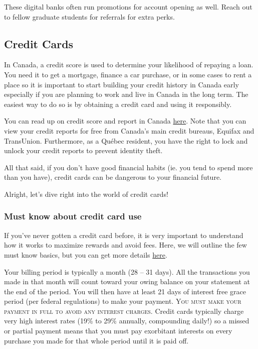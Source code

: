 \begin{plaincorollary}
    These digital banks often run promotions for account opening as well. Reach out to fellow graduate students for referrals for extra perks.
\end{plaincorollary}


\subsection{Credit Cards} 
In Canada, a credit score is used to determine your likelihood of repaying a loan. You need it to get a mortgage, finance a car purchase, or in some cases to rent a place so it is important to start building your credit history in Canada early especially if you are planning to work and live in Canada in the long term. The easiest way to do so is by obtaining a credit card and using it responsibly.  

You can read up on credit score and report in Canada \href{https://www.canada.ca/en/financial-consumer-agency/services/credit-reports-score/credit-report-score-basics.html}{here}. Note that you can view your credit reports for free from Canada's main credit bureaus, Equifax and TransUnion. Furthermore, as a Québec resident, you have the right to lock and unlock your credit reports to prevent identity theft.

All that said, if you don't have good financial habits (ie. you tend to spend more than you have), credit cards can be dangerous to your financial future. 

Alright, let's dive right into the world of credit cards!

\subsubsection{Must know about credit card use}
If you've never gotten a credit card before, it is very important to understand how it works to maximize rewards and avoid fees. Here, we will outline the few must know basics, but you can get more details \href{https://www.canada.ca/en/financial-consumer-agency/services/credit-cards/credit-card-work.html}{here}. 

Your billing period is typically a month (28 -- 31 days). All the transactions you made in that month will count toward your owing balance on your statement at the end of the period. You will then have at least 21 days of interest free grace period (per federal regulations) to make your payment. \textsc{\color{ocre}You must make your payment in full to avoid any interest charges.} Credit cards typically charge very high interest rates (19\% to 29\% annually, compounding daily!) so a missed or partial payment means that you must pay exorbitant interests on every purchase you made for that whole period until it is paid off.

